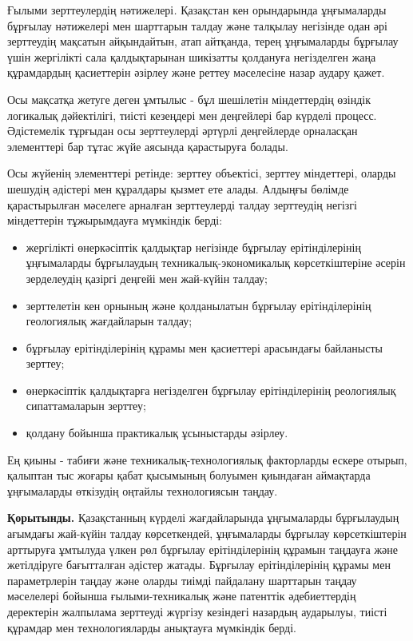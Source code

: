 \begin{multicols}{2}
Ғылыми зерттеулердің нәтижелері\emph{.} Қазақстан кен орындарында
ұңғымаларды бұрғылау нәтижелері мен шарттарын талдау және талқылау
негізінде одан әрі зерттеудің мақсатын айқындайтын, атап айтқанда, терең
ұңғымаларды бұрғылау үшін жергілікті сала қалдықтарынан шикізатты
қолдануға негізделген жаңа құрамдардың қасиеттерін әзірлеу және реттеу
мәселесіне назар аудару қажет.

Осы мақсатқа жетуге деген ұмтылыс - бұл шешілетін міндеттердің өзіндік
логикалық дәйектілігі, тиісті кезеңдері мен деңгейлері бар күрделі
процесс. Әдістемелік тұрғыдан осы зерттеулерді әртүрлі деңгейлерде
орналасқан элементтері бар тұтас жүйе аясында қарастыруға болады.

Осы жүйенің элементтері ретінде: зерттеу объектісі, зерттеу міндеттері,
оларды шешудің әдістері мен құралдары қызмет ете алады. Алдыңғы бөлімде
қарастырылған мәселеге арналған зерттеулерді талдау зерттеудің негізгі
міндеттерін тұжырымдауға мүмкіндік берді:

\begin{itemize}
\item
  жергілікті өнеркәсіптік қалдықтар негізінде бұрғылау ерітінділерінің
  ұңғымаларды бұрғылаудың техникалық-экономикалық көрсеткіштеріне әсерін
  зерделеудің қазіргі деңгейі мен жай-күйін талдау;
\item
  зерттелетін кен орнының және қолданылатын бұрғылау ерітінділерінің
  геологиялық жағдайларын талдау;
\item
  бұрғылау ерітінділерінің құрамы мен қасиеттері арасындағы байланысты
  зерттеу;
\item
  өнеркәсіптік қалдықтарға негізделген бұрғылау ерітінділерінің
  реологиялық сипаттамаларын зерттеу;
\item
  қолдану бойынша практикалық ұсыныстарды әзірлеу.
\end{itemize}

Ең қиыны - табиғи және техникалық-технологиялық факторларды ескере
отырып, қалыптан тыс жоғары қабат қысымының болуымен қиындаған
аймақтарда ұңғымаларды өткізудің оңтайлы технологиясын таңдау.

{\bfseries Қорытынды.} Қазақстанның күрделі жағдайларында ұңғымаларды
бұрғылаудың ағымдағы жай-күйін талдау көрсеткендей, ұңғымаларды бұрғылау
көрсеткіштерін арттыруға ұмтылуда үлкен рөл бұрғылау ерітінділерінің
құрамын таңдауға және жетілдіруге бағытталған әдістер жатады. Бұрғылау
ерітінділерінің құрамы мен параметрлерін таңдау және оларды тиімді
пайдалану шарттарын таңдау мәселелері бойынша ғылыми-техникалық және
патенттік әдебиеттердің деректерін жалпылама зерттеуді жүргізу кезіндегі
назардың аударылуы, тиісті құрамдар мен технологияларды анықтауға
мүмкіндік берді.


\end{multicols}
